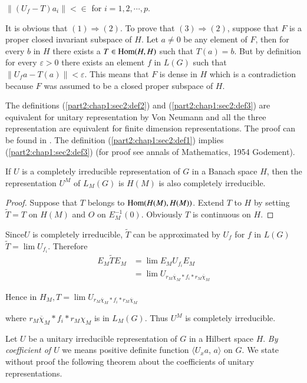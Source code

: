  $\parallel (U_f-T)a_i \parallel < \in$ \qquad for $i=1,2,\cdots, p$.
 
 It is obvious that $(1)\Rightarrow (2)$. To prove that
 $(3)\Rightarrow (2)$, suppose that $F$ is a proper closed invariant
 subspace of $H$. Let $a \neq 0$ be any element of $F$, then for every
 $b$ in $H$ there exists a $T \in \operatorname{Hom} (H, H)$ such that $T(a)=b$. But
 by definition for every $\varepsilon > 0$ there exists an
 element $f$ in $L(G)$ such that $\parallel U_f  a-T(a) \parallel
 <\varepsilon$. This means that $F$ is dense in $H$ which is a
 contradiction because $F$ was assumed to be a closed proper subspace
 of $H$.   
 
 The definitions (\ref{part2:chap1:sec2:def2}) and
 (\ref{part2:chap1:sec2:def3}) are equivalent for unitary
 representation 
 by Von Neumann and all the three representation are equivalent for
 finite dimension representations. The proof can be found in \cite{9}. The
 definition (\ref{part2:chap1:sec2:def1}) implies
 (\ref{part2:chap1:sec2:def3}) (for proof see annals of Mathematics,
 1954  Godement). 

\setcounter{Lemma}{0}
\begin{Lemma}\label{part2:chap1:sec2:lem1}
  If $U$ is a completely irreducible representation of $G$ in a Banach
  space $H$, then the representation $U^M$ of $L_M(G)$ is $H(M)$ is also
  completely irreducible. 
\end{Lemma}   
   
\begin{proof}
  Suppose that $T$ belongs to $\operatorname{Hom} (H(M), H(M))$. Extend $T$ to $H$ by
  setting $\tilde {T}=T$ on $H(M)$ and $O$ on
  $E^{-1}_M(0)$. Obviously $T$ is continuous on $H$. 
\end{proof}  
   
Since\pageoriginale $U$ is completely irreducible,  $\tilde{T}$ can be
approximated 
by $U_f$ for $f$ in $L(G)$ \iec  $\tilde {T}=\lim U_{f_i}$. Therefore  
\begin{align*}
  E_M \tilde{T} E_M &=\lim E_M U_{f_i} E_M\\
  &=\lim U_{r_M \overline{\chi}_M*f_i*r_M \overline{\chi}_M}
\end{align*}   
   
Hence in $H_M,T=\lim U_{r_M \overline{\chi}_M*f_i*r_M \overline{\chi}_M}$
   
where $r_M \overline{\chi}_M*f_i*r_M \chi _M$ is in $L_M(G)$. Thus
$U^M$ is completely irreducible. 
   
Let $U$ be a unitary irreducible representation of $G$ in a Hilbert
space $H$. \textit{By coefficient of $U$} we means positive definite
function $\langle U_x a$, $a \rangle$ on $G$. We state without proof the
following theorem about the coefficients of unitary representations. 

